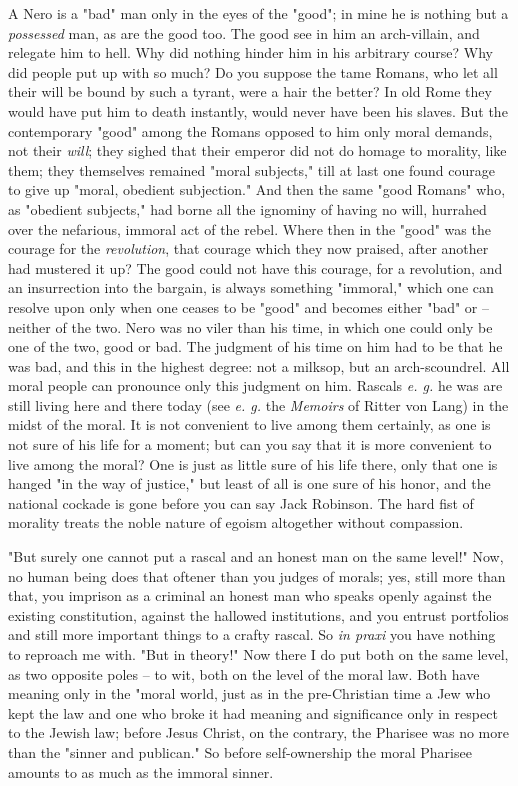 A Nero is a "{}bad"{} man only in the eyes of the "{}good"{}; in mine he is 
nothing but a \textit{possessed} man, as are the good too. The good see in him 
an arch-villain, and relegate him to hell. Why did nothing hinder him in his 
arbitrary course? Why did people put up with so much? Do you suppose the tame 
Romans, who let all their will be bound by such a tyrant, were a hair the 
better? In old Rome they would have put him to death instantly, would never 
have been his slaves. But the contemporary "{}good"{} among the Romans opposed 
to him only moral demands, not their \textit{will}; they sighed that their 
emperor did not do homage to morality, like them; they themselves remained 
"{}moral subjects,"{} till at last one found courage to give up "{}moral, 
obedient subjection."{} And then the same "{}good Romans"{} who, as 
"{}obedient subjects,"{} had borne all the ignominy of having no will, 
hurrahed over the nefarious, immoral act of the rebel. Where then in the 
"{}good"{} was the courage for the \textit{revolution}, that courage which 
they now praised, after another had mustered it up? The good could not have 
this courage, for a revolution, and an insurrection into the bargain, is 
always something "{}immoral,"{} which one can resolve upon only when one 
ceases to be "{}good"{} and becomes either "{}bad"{} or -- neither of the two. 
Nero was no viler than his time, in which one could only be one of the two, 
good or bad. The judgment of his time on him had to be that he was bad, and 
this in the highest degree: not a milksop, but an arch-scoundrel. All moral 
people can pronounce only this judgment on him. Rascals \textit{e. g.} he was 
are still living here and there today (see \textit{e. g.} the \textit{Memoirs} 
of Ritter von Lang) in the midst of the moral. It is not convenient to live 
among them certainly, as one is not sure of his life for a moment; but can you 
say that it is more convenient to live among the moral? One is just as little 
sure of his life there, only that one is hanged "{}in the way of justice,"{} 
but least of all is one sure of his honor, and the national cockade is gone 
before you can say Jack Robinson. The hard fist of morality treats the noble 
nature of egoism altogether without compassion.

"{}But surely one cannot put a rascal and an honest man on the same level!"{} 
Now, no human being does that oftener than you judges of morals; yes, still 
more than that, you imprison as a criminal an honest man who speaks openly 
against the existing constitution, against the hallowed institutions, and you 
entrust portfolios and still more important things to a crafty rascal. So 
\textit{in praxi} you have nothing to reproach me with. "{}But in theory!"{} 
Now there I do put both on the same level, as two opposite poles -- to wit, 
both on the level of the moral law. Both have meaning only in the "{}moral 
world, just as in the pre-Christian time a Jew who kept the law and one who 
broke it had meaning and significance only in respect to the Jewish law; 
before Jesus Christ, on the contrary, the Pharisee was no more than the 
"{}sinner and publican."{} So before self-ownership the moral Pharisee amounts 
to as much as the immoral sinner.


